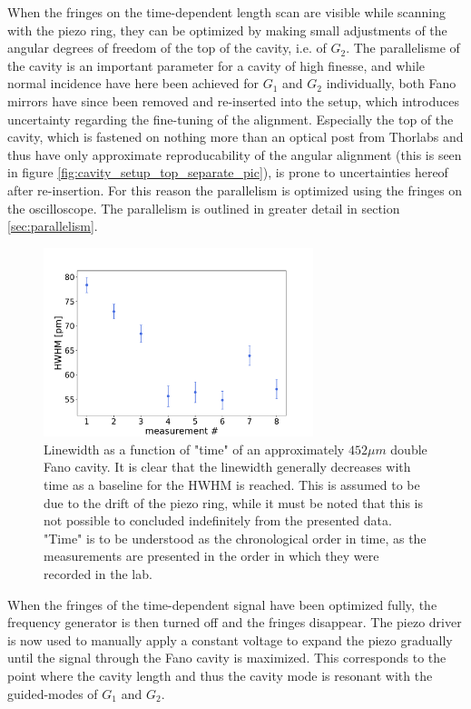 
When the fringes on the time-dependent length scan are visible while scanning with the piezo ring, they can be optimized by making small adjustments of the angular degrees of freedom of the top of the cavity, i.e. of $G_2$. The parallelisme of the cavity is an important parameter for a cavity of high finesse, and while normal incidence have here been achieved for $G_1$ and $G_2$ individually, both Fano mirrors have since been removed and re-inserted into the setup, which introduces uncertainty regarding the fine-tuning of the alignment. Especially the top of the cavity, which is fastened on nothing more than an optical post from Thorlabs and thus have only approximate reproducability of the angular alignment (this is seen in figure \ref{fig:cavity_setup_top_separate_pic}), is prone to uncertainties hereof after re-insertion. For this reason the parallelism is optimized using the fringes on the oscilloscope. The parallelism is outlined in greater detail in section \ref{sec:parallelism}.

\begin{figure}[h!]
    \centering
    \includegraphics[width=0.7\textwidth]{figures/HWHM_vs_time_20250266_452um.pdf}
    \caption{Linewidth as a function of "time" of an approximately $452 \mu m$ double Fano cavity. It is clear that the linewidth generally decreases with time as a baseline for the HWHM is reached. This is assumed to be due to the drift of the piezo ring, while it must be noted that this is not possible to concluded indefinitely from the presented data. "Time" is to be understood as the chronological order in time, as the measurements are presented in the order in which they were recorded in the lab.}
    \label{fig:HWHM_vs_time}
\end{figure}

When the fringes of the time-dependent signal have been optimized fully, the frequency generator is then turned off and the fringes disappear. The piezo driver is now used to manually apply a constant voltage to expand the piezo gradually until the signal through the Fano cavity is maximized. This corresponds to the point where the cavity length and thus the cavity mode is resonant with the guided-modes of $G_1$ and $G_2$.

